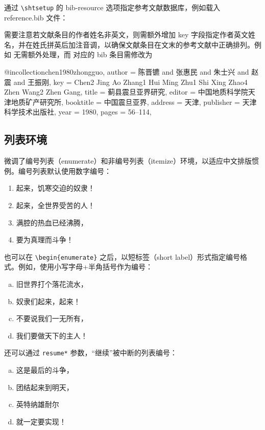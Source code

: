 \documentclass[master]{shtthesis}
\begin{document}
\shtthesis{} 通过 \verb|\shtsetup| 的 bib-resource 选项指定参考文献数据库，例如载入 reference.bib 文件：

需要注意若文献条目的作者姓名非英文，则需额外增加 key 字段指定作者英文姓名，并在姓氏拼英后加注音调，以确保文献条目在文末的参考文献中正确排列。例如 \citet{bravo1990comparative} 无需额外处理，而 \citet{chen1980zhongguo} 对应的 bib 条目需修改为
\begin{latex}
@incollection{chen1980zhongguo,
  author    = {陈晋镳 and 张惠民 and 朱士兴 and 赵震 and 王振刚},
  key       = {Chen2 Jing Ao Zhang1 Hui Ming Zhu1 Shi Xing Zhao4 Zhen Wang2 Zhen Gang},
  title     = {蓟县震旦亚界研究},
  editor    = {中国地质科学院天津地质矿产研究所},
  booktitle = {中国震旦亚界},
  address   = {天津},
  publisher = {天津科学技术出版社},
  year      = {1980},
  pages     = {56--114},
}
\end{latex}

\subsection{列表环境}
\shtthesis{} 微调了编号列表（enumerate）和非编号列表（itemize）环境，以适应中文排版惯例。编号列表默认使用数字编号：
\begin{enumerate}
  \item 起来，饥寒交迫的奴隶！
  \item 起来，全世界受苦的人！
  \item 满腔的热血已经沸腾，
  \item 要为真理而斗争！
\end{enumerate}
也可以在 \verb|\begin{enumerate}| 之后，以短标签（short label）形式指定编号格式。例如，使用小写字母+半角括号作为编号：
\begin{enumerate}[a)]
  \item 旧世界打个落花流水，
  \item 奴隶们起来，起来！
  \item 不要说我们一无所有，
  \item 我们要做天下的主人！
\end{enumerate}
还可以通过 \verb|resume*| 参数，“继续”被中断的列表编号：
\begin{enumerate}[a), resume*]
  \item 这是最后的斗争，
  \item 团结起来到明天，
  \item 英特纳雄耐尔
  \item 就一定要实现！
\end{enumerate}
\end{document}
